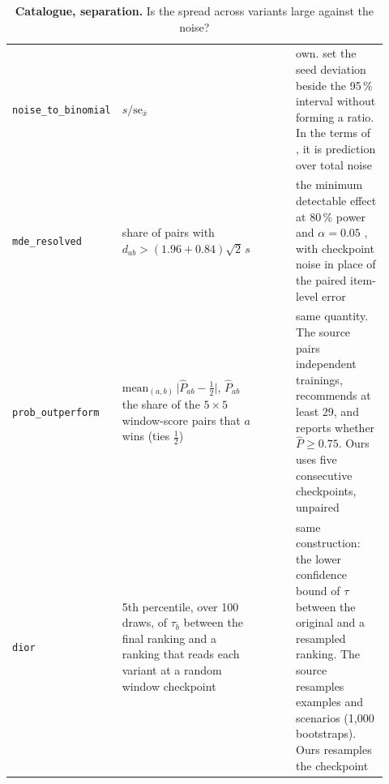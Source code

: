 \begin{table}[t]
\begin{tabular}{@{}p{0.215\linewidth}p{0.28\linewidth}p{0.14\linewidth}p{0.285\linewidth}@{}}
\texttt{noise\_to\_binomial} & $s/\mathrm{se}_{\bar{x}}$ & \citet{madaan_quantifying_2024, wang_measuring_2025} & own. \citet{madaan_quantifying_2024} set the seed deviation beside the 95\,\% interval without forming a ratio. In the terms of \citet{wang_measuring_2025}, it is prediction over total noise \\
\texttt{mde\_resolved} & share of pairs with $d_{ab} > (1.96 + 0.84)\sqrt{2}\,s$ & \citet{card_little_2020, miller_adding_2024} & the minimum detectable effect at 80\,\% power and $\alpha = 0.05$ \citep[Eq.~10]{miller_adding_2024}, with checkpoint noise in place of the paired item-level error \\
\texttt{prob\_outperform} & $\mathrm{mean}_{(a,b)}\,\big|\hat{P}_{ab} - \tfrac12\big|$, $\hat{P}_{ab}$ the share of the $5 \times 5$ window-score pairs that $a$ wins (ties $\tfrac12$) & \citet{bouthillier_accounting_2021} & same quantity. The source pairs independent trainings, recommends at least 29, and reports whether $\hat{P} \geq 0.75$. Ours uses five consecutive checkpoints, unpaired \\
\texttt{dior} & 5th percentile, over 100 draws, of $\tau_b$ between the final ranking and a ranking that reads each variant at a random window checkpoint & \citet{perlitz_efficient_2024} & same construction: the lower confidence bound of $\tau$ between the original and a resampled ranking. The source resamples examples and scenarios (1{,}000 bootstraps). Ours resamples the checkpoint \\
\bottomrule
\end{tabular}
\caption{\textbf{Catalogue, separation.} Is the spread across variants large against the noise?}
\label{tab:sur-separation}
\end{table}


